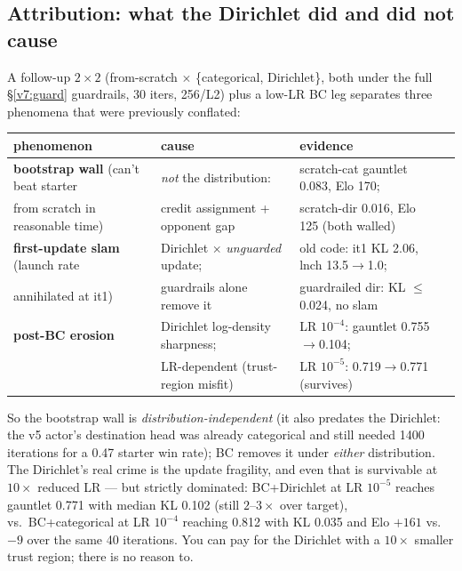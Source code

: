 \documentclass[11pt]{article}
\begin{document}
\subsection{Attribution: what the Dirichlet did and did not cause}\label{v7:attrib}
A follow-up $2{\times}2$ (from-scratch $\times$ \{categorical, Dirichlet\}, both under the full
\S\ref{v7:guard} guardrails, 30 iters, 256/L2) plus a low-LR BC leg separates three phenomena that
were previously conflated:
\begin{center}\small
\begin{tabular}{@{}llll@{}}
\toprule
phenomenon & cause & evidence \\
\midrule
\textbf{bootstrap wall} (can't beat starter & \emph{not} the distribution: & scratch-cat gauntlet 0.083, Elo 170; \\
\quad from scratch in reasonable time) & credit assignment + opponent gap & scratch-dir 0.016, Elo 125 (both walled) \\
\textbf{first-update slam} (launch rate & Dirichlet $\times$ \emph{unguarded} update; & old code: it1 KL 2.06, lnch 13.5$\to$1.0; \\
\quad annihilated at it1) & guardrails alone remove it & guardrailed dir: KL $\le$0.024, no slam \\
\textbf{post-BC erosion} & Dirichlet log-density sharpness; & LR $10^{-4}$: gauntlet 0.755$\to$0.104; \\
 & LR-dependent (trust-region misfit) & LR $10^{-5}$: 0.719$\to$0.771 (survives) \\
\bottomrule
\end{tabular}
\end{center}
\noindent So the bootstrap wall is \emph{distribution-independent} (it also predates the Dirichlet:
the v5 actor's destination head was already categorical and still needed 1400 iterations for a
0.47 starter win rate); BC removes it under \emph{either} distribution. The Dirichlet's real crime
is the update fragility, and even that is survivable at $10\times$ reduced LR --- but strictly
dominated: BC+Dirichlet at LR $10^{-5}$ reaches gauntlet 0.771 with median KL 0.102 (still
$2$--$3\times$ over target), vs.\ BC+categorical at LR $10^{-4}$ reaching 0.812 with KL 0.035 and
Elo $+161$ vs.\ $-9$ over the same 40 iterations. You can pay for the Dirichlet with a $10\times$
smaller trust region; there is no reason to.
\end{document}
